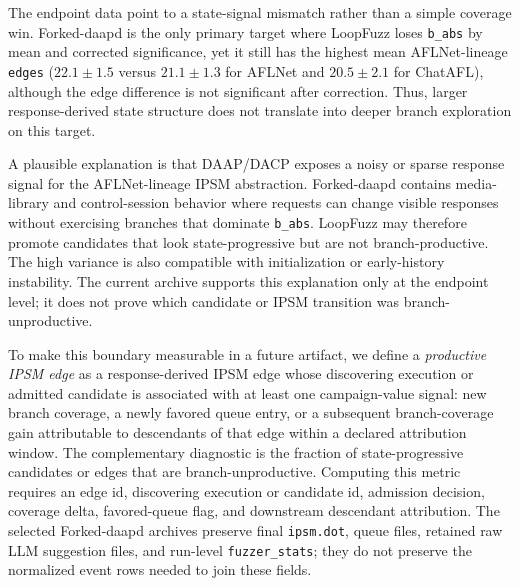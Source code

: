 \documentclass[final,5p,times,number]{elsarticle}
\begin{document}
The endpoint data point to a state-signal mismatch rather than a simple coverage win. Forked-daapd is the only primary target where LoopFuzz loses \texttt{b\_abs} by mean and corrected significance, yet it still has the highest mean AFLNet-lineage \texttt{edges} ($22.1{\pm}1.5$ versus $21.1{\pm}1.3$ for AFLNet and $20.5{\pm}2.1$ for ChatAFL), although the edge difference is not significant after correction. Thus, larger response-derived state structure does not translate into deeper branch exploration on this target.

A plausible explanation is that DAAP/DACP exposes a noisy or sparse response signal for the AFLNet-lineage IPSM abstraction. Forked-daapd contains media-library and control-session behavior where requests can change visible responses without exercising branches that dominate \texttt{b\_abs}. LoopFuzz may therefore promote candidates that look state-progressive but are not branch-productive. The high variance is also compatible with initialization or early-history instability. The current archive supports this explanation only at the endpoint level; it does not prove which candidate or IPSM transition was branch-unproductive.

To make this boundary measurable in a future artifact, we define a \emph{productive IPSM edge} as a response-derived IPSM edge whose discovering execution or admitted candidate is associated with at least one campaign-value signal: new branch coverage, a newly favored queue entry, or a subsequent branch-coverage gain attributable to descendants of that edge within a declared attribution window. The complementary diagnostic is the fraction of state-progressive candidates or edges that are branch-unproductive. Computing this metric requires an edge id, discovering execution or candidate id, admission decision, coverage delta, favored-queue flag, and downstream descendant attribution. The selected Forked-daapd archives preserve final \texttt{ipsm.dot}, queue files, retained raw LLM suggestion files, and run-level \texttt{fuzzer\_stats}; they do not preserve the normalized event rows needed to join these fields.
\end{document}
